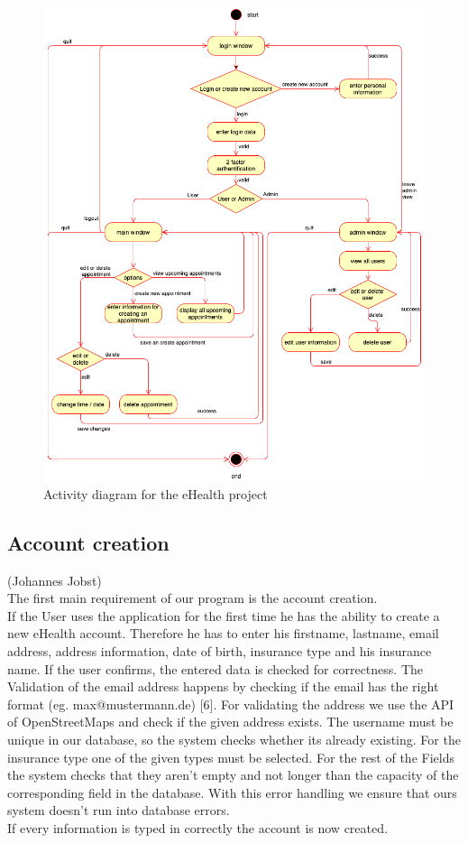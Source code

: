 \documentclass[a4paper, 12pt]{report}
\begin{document}
\begin{figure}[!h]
	\includegraphics[width=\linewidth]{eHealth_Activity.png}
	\caption{Activity diagram for the eHealth project}
\end{figure}

\subsection{Account creation}
{\tiny (Johannes Jobst)\\}
The first main requirement of our program is the account creation.\\
If the User uses the application for the first time he has the ability to create a new eHealth account. Therefore he has to enter his firstname, lastname, email address, address information, date of birth, insurance type and his insurance name.
If the user confirms, the entered data is checked for correctness.
The Validation of the email address happens by checking if the email has the right format (eg. max@mustermann.de) [6]. For validating the address we use the API of OpenStreetMaps and check if the given address exists.
The username must be unique in our database, so the system checks whether its already existing. For the insurance type one of the given types must be selected.
For the rest of the Fields the system checks that they aren't empty and not longer than the capacity of the corresponding field in the database.
With this error handling we ensure that ours system doesn't run into database errors.\\
If every information is typed in correctly the account is now created.
\end{document}
